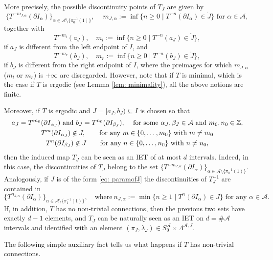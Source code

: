 \documentclass[JEP,XML,SOM,Unicode,NoEqCountersInSection,NoFloatCountersInSection,published]{cedram}
\theoremstyle{plain}
\theoremstyle{definition}
\newcommand{\A}{\mathcal{A}}
\newcommand{\Z}{\mathbb{Z}}
\begin{document}
{{More precisely, the possible discontinuity points of $T_J$ are given by
\[
\{T^{-m_{J,\alpha}}(\partial I_{\alpha})\}_{\alpha\in \A \setminus \{\pi_0^{-1}(1)\}}, \quad\ m_{J,\alpha}:=\inf\{n\geq 0 \mid T^{-n}(\partial I_{\alpha})\in \mathring{J}\} \text{ \ for } \alpha \in \A,
\]
together with
\[
T^{-m_l}(a_J), \quad m_l :=\inf\{n\ge 0 \mid T^{-n}(a_J)\in \mathring{J}\},
\]
if $a_J$ is different from the left endpoint of $I$, and
\[
T^{-m_r}(b_J), \quad m_r :=\inf\{n\ge 0 \mid T^{-n}(b_J)\in \mathring{J}\},
\]
if $b_J$ is different from the right endpoint of $I$,} where the preimages for
which $m_{J, \alpha}$ (\resp $m_l$ or $m_r$) is $+\infty$ are disregarded.
However, note that if $T$ is minimal, which is the case if $T$ is ergodic (see
Lemma \ref{lem: minimality}), all the above notions are finite.

Moreover, if $T$ is ergodic and $J=[a_J,b_J)\subseteq I$ is chosen so that
\begin{equation}\label{eq: paramofJ}
\begin{gathered}
\text{$a_J=T^{m_0}(\partial I_{\alpha_J})$ and $b_J=T^{n_0}(\partial I_{\beta_J})$, \quad for some $\alpha_J,\beta_J\in\mathcal A$ and $m_0,n_0\in\Z$,} \\
T^{m}(\partial I_{\alpha_J})\notin J, \qquad \text{for any } m \in \{0, \ldots, m_0\} \text{ with } m \neq m_0 \\
T^n(\partial I_{\beta_J})\notin J \qquad \text{for any } n \in \{0, \ldots, n_0\} \text{ with } n \neq n_0,
\end{gathered}
\end{equation}
then the induced map $T_J$ can be seen as an IET of at most $d$ intervals. Indeed, in this case, the discontinuities of $T_J$ belong to the set $
\{T^{-m_{J,\alpha}}(\partial I_{\alpha})\}_{\alpha\in \A\setminus \{\pi_0^{-1}(1)\}}$. Analogously, if $J$ is of the form \eqref{eq: paramofJ} the discontinuities of $T_J^{-1}$ are contained in
\[
\{T^{n_{J,\alpha}}(\partial I_{\alpha})\}_{\alpha\in \A\setminus \{\pi_1^{-1}(1)\}},\!\quad \text{where}\ n_{J,\alpha}:=\min\{n\geq 1\mid T^{n}(\partial I_{\alpha})\in J\} \text{ for any } \alpha \in \A.
\]
If, in addition, $T$ has no non-trivial connections, then the previous two sets have exactly $d - 1$ elements, and $T_J$ can be naturally seen as an IET on $d=\#\A$ intervals and identified with an element $(\pi_J, \lambda_J) \in S_0^\A \times \Lambda^{\A, J}$.

The following simple auxiliary fact tells us what happens if $T$ has non-trivial
connections.

}
\end{document}
